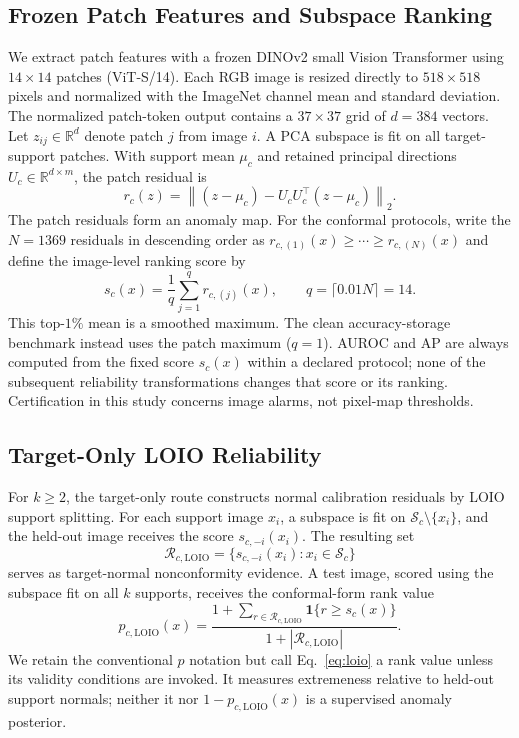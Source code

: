 \subsection{Frozen Patch Features and Subspace Ranking}
We extract patch features with a frozen DINOv2 small Vision Transformer using $14\times14$ patches (ViT-S/14). Each RGB image is resized directly to $518\times518$ pixels and normalized with the ImageNet channel mean and standard deviation. The normalized patch-token output contains a $37\times37$ grid of $d=384$ vectors. Let $z_{ij}\in\mathbb{R}^{d}$ denote patch $j$ from image $i$. A PCA subspace is fit on all target-support patches. With support mean $\mu_c$ and retained principal directions $U_c\in\mathbb{R}^{d\times m}$, the patch residual is
\begin{equation}\label{eq:residual}
    r_c(z)=\left\|(z-\mu_c)-U_cU_c^{\top}(z-\mu_c)\right\|_2.
\end{equation}
The patch residuals form an anomaly map. For the conformal protocols, write the $N=1369$ residuals in descending order as $r_{c,(1)}(x)\geq\cdots\geq r_{c,(N)}(x)$ and define the image-level ranking score by
\begin{equation}\label{eq:score}
    s_c(x)=\frac{1}{q}\sum_{j=1}^{q}r_{c,(j)}(x),
    \qquad q=\lceil0.01N\rceil=14.
\end{equation}
This top-$1\%$ mean is a smoothed maximum. The clean accuracy-storage benchmark instead uses the patch maximum ($q=1$). AUROC and AP are always computed from the fixed score $s_c(x)$ within a declared protocol; none of the subsequent reliability transformations changes that score or its ranking. Certification in this study concerns image alarms, not pixel-map thresholds.

\subsection{Target-Only LOIO Reliability}
For $k\geq2$, the target-only route constructs normal calibration residuals by LOIO support splitting. For each support image $x_i$, a subspace is fit on $\mathcal{S}_c\setminus\{x_i\}$, and the held-out image receives the score $s_{c,-i}(x_i)$. The resulting set
\begin{equation}\label{eq:rloio}
    \mathcal{R}_{c,\mathrm{LOIO}}
    =\{s_{c,-i}(x_i):x_i\in\mathcal{S}_c\}
\end{equation}
serves as target-normal nonconformity evidence. A test image, scored using the subspace fit on all $k$ supports, receives the conformal-form rank value
\begin{equation}\label{eq:loio}
    p_{c,\mathrm{LOIO}}(x)
    =\frac{1+\sum_{r\in\mathcal{R}_{c,\mathrm{LOIO}}}
    \mathbf{1}\{r\geq s_c(x)\}}
    {1+|\mathcal{R}_{c,\mathrm{LOIO}}|}.
\end{equation}
We retain the conventional $p$ notation but call Eq.~\eqref{eq:loio} a rank value unless its validity conditions are invoked. It measures extremeness relative to held-out support normals; neither it nor $1-p_{c,\mathrm{LOIO}}(x)$ is a supervised anomaly posterior.

